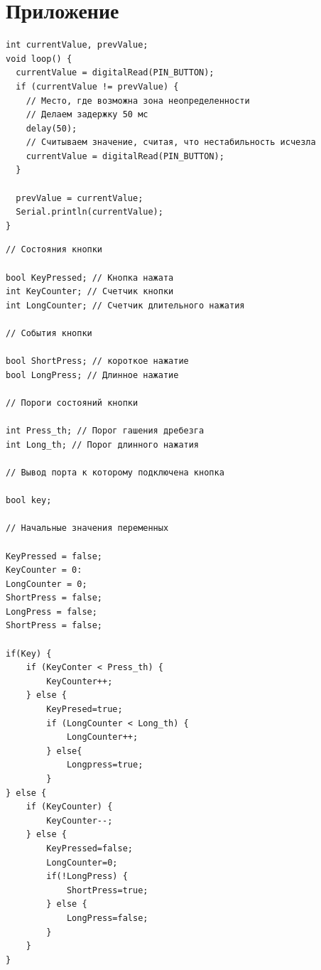 \documentclass{altsu-report}
\begin{document}
\newpage
{}
\printbibliography[title={Список использованной литературы}]

\chapter*{Приложение}

\begin{code}
\label{code:pi-example}
\begin{verbatim}
int currentValue, prevValue;
void loop() {
  currentValue = digitalRead(PIN_BUTTON);
  if (currentValue != prevValue) {
    // Место, где возможна зона неопределенности
    // Делаем задержку 50 мс
    delay(50);
    // Считываем значение, считая, что нестабильность исчезла
    currentValue = digitalRead(PIN_BUTTON);
  }

  prevValue = currentValue;
  Serial.println(currentValue);
}
\end{verbatim}
\end{code}

\begin{code}
\label{code:pi-example}
\begin{verbatim}
// Состояния кнопки

bool KeyPressed; // Кнопка нажата
int KeyCounter; // Счетчик кнопки
int LongCounter; // Счетчик длительного нажатия

// События кнопки

bool ShortPress; // короткое нажатие
bool LongPress; // Длинное нажатие

// Пороги состояний кнопки

int Press_th; // Порог гашения дребезга
int Long_th; // Порог длинного нажатия

// Вывод порта к которому подключена кнопка

bool key;

// Начальные значения переменных

KeyPressed = false;
KeyCounter = 0:
LongCounter = 0;
ShortPress = false;
LongPress = false;
ShortPress = false;

if(Key) {
    if (KeyConter < Press_th) {
        KeyCounter++;
    } else { 
        KeyPresed=true; 
        if (LongCounter < Long_th) {
            LongCounter++; 
        } else{ 
            Longpress=true;
        }
} else {
    if (KeyCounter) {
        KeyCounter--;
    } else { 
        KeyPressed=false; 
        LongCounter=0; 
        if(!LongPress) {
            ShortPress=true; 
        } else { 
            LongPress=false;
        }
    }
}
\end{verbatim}
\end{code}
\end{document}
